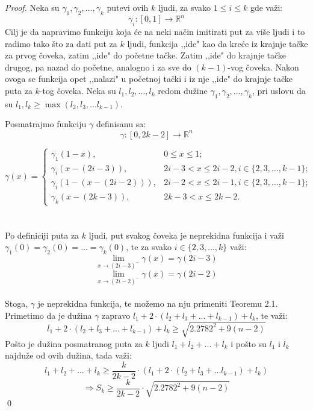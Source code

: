 \documentclass[11pt]{article}
\begin{document}
\begin{proof}
Neka su $\gamma_1, \gamma_2,..., \gamma_k$ putevi ovih $k$ ljudi, za svako $1\leqslant i\leqslant k$ gde va\v zi:
$$\gamma_i: [0,1]\to \mathbb{R}^n$$
\indent Cilj je da napravimo funkciju koja \' ce na neki na\v cin imitirati put za vi\v se ljudi i to radimo tako \v sto za dati put za $k$ ljudi, funkcija ,,ide" kao da kre\' ce iz krajnje ta\v cke za prvog \v coveka, zatim ,,ide" do po\v cetne ta\v cke. Zatim ,,ide" do krajnje ta\v cke drugog, pa nazad do po\v cetne, analogno i za sve do $(k-1)$-vog \v coveka.  Nakon ovoga se funkcija opet ,,nalazi" u po\v cetnoj ta\v cki i iz nje ,,ide" do krajnje ta\v cke puta za $k$-tog \v coveka.
Neka su $l_1, l_2,...,l_k$ redom du\v zine $\gamma_1, \gamma_2,..., \gamma_k$, pri uslovu da su $l_1, l_k\geqslant \max{(l_2,l_3,...l_{k-1})}.$

 Posmatrajmo funkciju $\gamma$ definisanu sa:
$$\gamma: [0, 2k-2]\to \mathbb{R}^n$$

\[ \gamma(x) = \begin{cases}  
          \gamma_1(1-x), & 0\leqslant x\leqslant 1; \\
          \gamma_i(x-(2i-3)), & 2i-3< x \leqslant2i-2, i\in\{2,3,...,k-1\};\\
	 \gamma_i (1-(x-(2i-2))),& 2i-2< x\leqslant 2i-1, i \in\{2,3,...,k-1\};\\
          \gamma_k(x-(2k-3)), & 2k-3<x \leqslant 2k-2.
       \end{cases}
 \]
\\
\\
\indent Po definiciji puta za $k$ ljudi, put svakog \v coveka je neprekidna funkcija i va\v zi $\gamma_1(0)=\gamma_2(0)=...=\gamma_k(0)$, te za svako $i\in \{2,3,...,k\}$ va\v zi:
$$\lim_{x\to (2i-3)^-}\gamma(x)=\gamma(2i-3)$$
$$\lim_{x\to (2i-2)^-}\gamma(x)=\gamma(2i-2)$$
\\
\indent Stoga,  $\gamma$ je neprekidna funkcija, te mo\v zemo na nju primeniti Teoremu 2.1. Primetimo da je du\v zina $\gamma$ zapravo $l_1+2\cdot(l_2+l_3+...+l_{k-1})+l_k$, te va\v zi:
$$l_1+2\cdot(l_2+l_3+...+l_{k-1})+l_k\geqslant\sqrt{2.2782^2+9(n-2)}$$
\indent Po\v sto je du\v zina posmatranog puta za $k$ ljudi $l_1+l_2+...+l_k$ i po\v sto su $l_1$ i $l_k$ najdu\v ze od ovih du\v zina, tada va\v zi:
$$l_1+l_2+...+l_k\geqslant \frac{k}{2k-2}\cdot (l_1+2\cdot(l_2+l_3+...l_{k-1})+l_k)$$
$$\Longrightarrow S_k\geqslant \frac{k}{2k-2}\cdot \sqrt{2.2782^2+9(n-2)}$$\qed
\end{proof}
\end{document}
